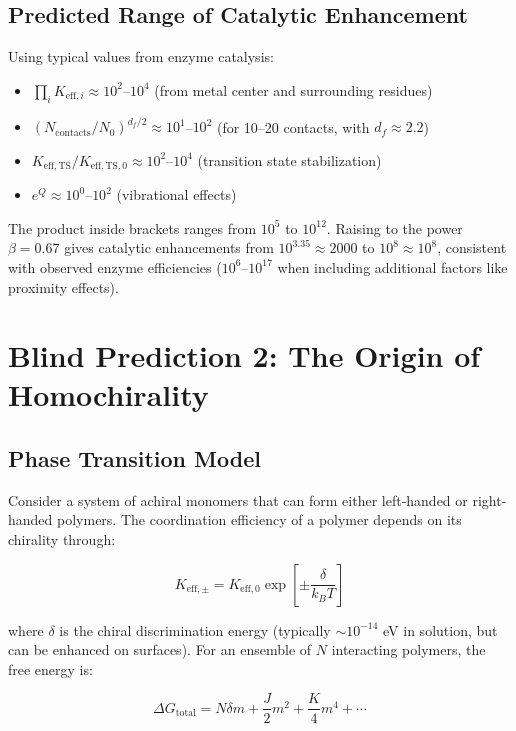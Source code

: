\documentclass[12pt,a4paper]{article}
\theoremstyle{remark}
\newcommand{\df}{d_{\!f}}
\begin{document}
	\subsection{Predicted Range of Catalytic Enhancement}
	
	Using typical values from enzyme catalysis:
	\begin{itemize}
		\item $\prod_i K_{\mathrm{eff},i} \approx 10^2$--$10^4$ (from metal center and surrounding residues)
		\item $(N_{\text{contacts}}/N_0)^{\df/2} \approx 10^1$--$10^2$ (for 10--20 contacts, with $\df \approx 2.2$)
		\item $K_{\mathrm{eff},\text{TS}}/K_{\mathrm{eff},\text{TS},0} \approx 10^2$--$10^4$ (transition state stabilization)
		\item $e^{Q} \approx 10^0$--$10^2$ (vibrational effects)
	\end{itemize}
	
	The product inside brackets ranges from $10^5$ to $10^{12}$. Raising to the power $\beta = 0.67$ gives catalytic enhancements from $10^{3.35} \approx 2000$ to $10^{8} \approx 10^8$, consistent with observed enzyme efficiencies ($10^6$--$10^{17}$ when including additional factors like proximity effects).
	
	\section{Blind Prediction 2: The Origin of Homochirality}
	\label{sec:chirality}
	
	\subsection{Phase Transition Model}
	
	Consider a system of achiral monomers that can form either left-handed or right-handed polymers. The coordination efficiency of a polymer depends on its chirality through:
	
	\begin{equation}
		K_{\mathrm{eff},\pm} = K_{\mathrm{eff},0} \exp\left[\pm \frac{\delta}{k_B T}\right]
		\label{eq:keff-chiral}
	\end{equation}
	
	where $\delta$ is the chiral discrimination energy (typically $\sim 10^{-14}$ eV in solution, but can be enhanced on surfaces). For an ensemble of $N$ interacting polymers, the free energy is:
	
	\begin{equation}
		\Delta G_{\text{total}} = N \delta m + \frac{J}{2} m^2 + \frac{K}{4} m^4 + \cdots
		\label{eq:chiral-free}
	\end{equation}
	
\end{document}
